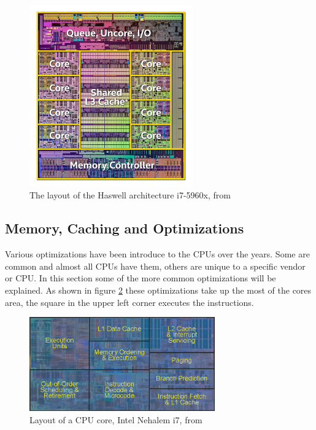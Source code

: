 \documentclass[10pt,a4paper]{report}
\begin{document}
\begin{figure}[h]
    \centering
    \includegraphics[width=7cm]{cpu_scheme_haswell.jpg}
    \caption{The layout of the Haswell architecture i7-5960x, from \cite{intel_haswell_2014}}
    \label{fig:cpu_scheme}
\end{figure}

\newpage
\subsection{Memory, Caching and Optimizations}
\label{optimizations}
Various optimizations have been introduce to the CPUs over the years\cite{drepper2007cpumemory, introduction_hpc_hager}. Some are common and almost all CPUs have them, others are unique to a specific vendor or CPU\cite{introduction_hpc_hager}. In this section some of the more common optimizations will be explained. As shown in figure \ref{fig:core_die} these optimizations take up the most of the cores area, the square in the upper left corner executes the instructions.

\begin{figure}[h]
    \centering
    \includegraphics[width=8cm]{cpu_core_die.png}
    \caption{Layout of a CPU core, Intel Nehalem i7, from \cite{tomshardware_nehalem}}
    \label{fig:core_die}
\end{figure}
\end{document}
